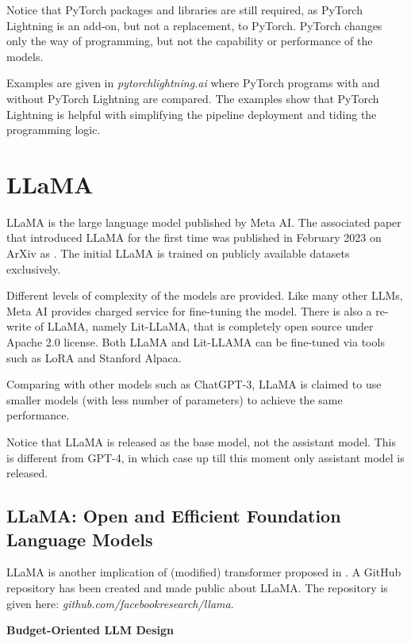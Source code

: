 Notice that PyTorch packages and libraries are still required, as PyTorch Lightning is an add-on, but not a replacement, to PyTorch. PyTorch changes only the way of programming, but not the capability or performance of the models.

Examples are given in \textit{pytorchlightning.ai} where PyTorch programs with and without PyTorch Lightning are compared. The examples show that PyTorch Lightning is helpful with simplifying the pipeline deployment and tiding the programming logic.

\section{LLaMA}

LLaMA is the large language model published by Meta AI. The associated paper that introduced LLaMA for the first time was published in February 2023 on ArXiv as \cite{touvron2023llama}. The initial LLaMA is trained on publicly available datasets exclusively.

Different levels of complexity of the models are provided. Like many other LLMs, Meta AI provides charged service for fine-tuning the model. There is also a re-write of LLaMA, namely Lit-LLaMA, that is completely open source under Apache 2.0 license. Both LLaMA and Lit-LLAMA can be fine-tuned via tools such as LoRA and Stanford Alpaca.

Comparing with other models such as ChatGPT-3, LLaMA is claimed to use smaller models (with less number of parameters) to achieve the same performance.

Notice that LLaMA is released as the base model, not the assistant model. This is different from GPT-4, in which case up till this moment only assistant model is released.

\subsection{LLaMA: Open and Efficient Foundation Language Models}

LLaMA is another implication of (modified) transformer proposed in \cite{vaswani2017attention}. A GitHub repository has been created and made public about LLaMA. The repository is given here: \textit{github.com/facebookresearch/llama}.

\vspace{0.1in}
\noindent \textbf{Budget-Oriented LLM Design}
\vspace{0.1in}

